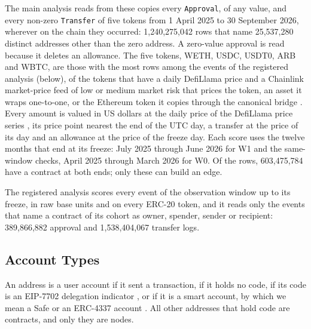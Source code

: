 \documentclass{ieeeaccess}
\begin{document}
The main analysis reads from these copies every \texttt{Approval}, of any value, and every non-zero \texttt{Transfer} of five tokens from 1 April 2025 to 30 September 2026, wherever on the chain they occurred: 1,240,275,042 rows that name 25,537,280 distinct addresses other than the zero address. A zero-value approval is read because it deletes an allowance. The five tokens, WETH, USDC, USDT0, ARB and WBTC, are those with the most rows among the events of the registered analysis (below), of the tokens that have a daily DefiLlama price and a Chainlink market-price feed of low or medium market risk that prices the token, an asset it wraps one-to-one, or the Ethereum token it copies through the canonical bridge \cite{chainlinknddatafeeds}. Every amount is valued in US dollars at the daily price of the DefiLlama price series \cite{defillamanddocs}, its price point nearest the end of the UTC day, a transfer at the price of its day and an allowance at the price of the freeze day. Each score uses the twelve months that end at its freeze: July 2025 through June 2026 for W1 and the same-window checks, April 2025 through March 2026 for W0. Of the rows, 603,475,784 have a contract at both ends; only these can build an edge.

The registered analysis scores every event of the observation window up to its freeze, in raw base units and on every ERC-20 token, and it reads only the events that name a contract of its cohort as owner, spender, sender or recipient: 389,866,882 approval and 1,538,404,067 transfer logs.

\subsection{Account Types}
\label{sec:types}
An address is a user account if it sent a transaction, if it holds no code, if its code is an EIP-7702 delegation indicator \cite{buterin2024eip7702}, or if it is a smart account, by which we mean a Safe \cite{safenddocs} or an ERC-4337 account \cite{buterin2021erc4337}. All other addresses that hold code are contracts, and only they are nodes.
\end{document}
